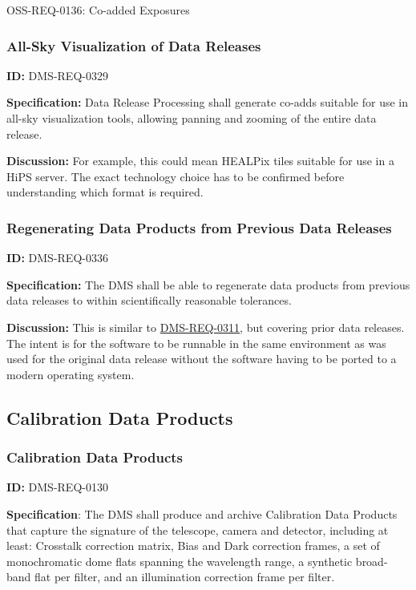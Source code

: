 \documentclass[SE,toc,lsstdraft]{lsstdoc}
\begin{document}
OSS-REQ-0136:
Co-added Exposures \newline


\subsubsection{All-Sky Visualization of Data Releases}

\label{DMS-REQ-0329}
\textbf{ID:} DMS-REQ-0329

\textbf{Specification:} Data Release Processing shall generate co-adds suitable for use in all-sky visualization tools, allowing panning and zooming of the entire data release.

\textbf{Discussion:} For example, this could mean HEALPix tiles suitable for use in a HiPS server. The exact technology choice has to be confirmed before understanding which format is required.




\subsubsection{Regenerating Data Products from Previous Data Releases}

\label{DMS-REQ-0336}
\textbf{ID:} DMS-REQ-0336

\textbf{Specification:} The DMS shall be able to regenerate data products from previous data releases to within scientifically reasonable tolerances.

\textbf{Discussion:} This is similar to \hyperref[DMS-REQ-0311]{DMS-REQ-0311}, but covering prior data releases. The intent is for the software to be runnable in the same environment as was used for the original data release without the software having to be ported to a modern operating system.




\subsection{Calibration Data Products}





\subsubsection{Calibration Data Products}

\label{DMS-REQ-0130}
\textbf{ID:} DMS-REQ-0130

\textbf{Specification}: The DMS shall produce and archive Calibration Data Products that capture the signature of the telescope, camera and detector, including at least: Crosstalk correction matrix, Bias and Dark correction frames, a set of monochromatic dome flats spanning the wavelength range, a synthetic broad-band flat per filter, and an illumination correction frame per filter.
\end{document}

